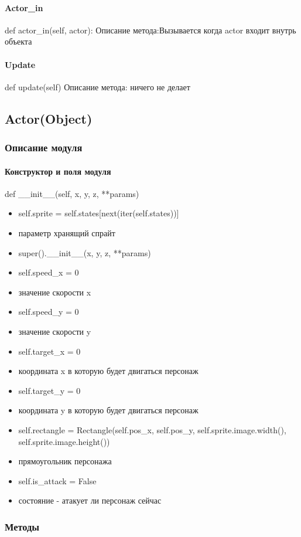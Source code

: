 \paragraph{Actor\_in}
 def actor\_in(self, actor):
Описание метода:Вызывается когда actor входит внутрь объекта
\paragraph{Update}
def update(self)
Описание метода: ничего не делает

\subsection{Actor(Object)}
\subsubsection{Описание модуля}
\paragraph{Конструктор и поля модуля}
def \_\_init\_\_(self, x, y, z, **params)
\begin{itemize}
	\item self.sprite = self.states[next(iter(self.states))]
	\item параметр хранящий спрайт
	\item super().\_\_init\_\_(x, y, z, **params)
	\item self.speed\_x = 0 
	\item значение скорости x
	\item self.speed\_y = 0  
	\item значение скорости y
	\item self.target\_x = 0
	\item координата x в которую будет двигаться персонаж
	\item self.target\_y = 0
	\item координата y в которую будет двигаться персонаж
	\item self.rectangle = Rectangle(self.pos\_x, self.pos\_y, self.sprite.image.width(), self.sprite.image.height())
	\item прямоугольник персонажа
	\item self.is\_attack = False
	\item состояние - атакует ли персонаж сейчас
\end{itemize}
\subsubsection{Методы}
